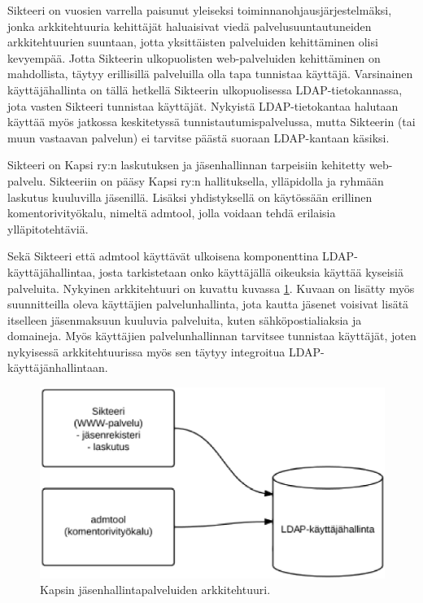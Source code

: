 Sikteeri on vuosien varrella paisunut yleiseksi toiminnanohjausjärjestelmäksi, jonka arkkitehtuuria kehittäjät haluaisivat viedä palvelusuuntautuneiden arkkitehtuurien suuntaan, jotta yksittäisten palveluiden kehittäminen olisi kevyempää. Jotta Sikteerin ulkopuolisten web-palveluiden kehittäminen on mahdollista, täytyy erillisillä palveluilla olla tapa tunnistaa käyttäjä. Varsinainen käyttäjähallinta on tällä hetkellä Sikteerin ulkopuolisessa LDAP-tietokannassa, jota vasten Sikteeri tunnistaa käyttäjät. Nykyistä LDAP-tietokantaa halutaan käyttää myös jatkossa keskitetyssä tunnistautumispalvelussa, mutta Sikteerin (tai muun vastaavan palvelun) ei tarvitse päästä suoraan LDAP-kantaan käsiksi.

Sikteeri on Kapsi ry:n laskutuksen ja jäsenhallinnan tarpeisiin kehitetty web-palvelu. Sikteeriin on pääsy Kapsi ry:n hallituksella, ylläpidolla ja ryhmään laskutus kuuluvilla jäsenillä. Lisäksi yhdistyksellä on käytössään erillinen komentorivityökalu, nimeltä admtool, jolla voidaan tehdä erilaisia ylläpitotehtäviä.

Sekä Sikteeri että admtool käyttävät ulkoisena komponenttina LDAP-käyt\-tä\-jä\-hal\-lin\-taa, josta tarkistetaan onko käyttäjällä oikeuksia käyttää kyseisiä palveluita. Nykyinen arkkitehtuuri on kuvattu kuvassa \ref{kapsi_nykyinen}. Kuvaan on lisätty myös suunnitteilla oleva käyttäjien palvelunhallinta, jota kautta jäsenet voisivat lisätä itselleen jäsenmaksuun kuuluvia palveluita, kuten sähköpostialiaksia ja domaineja. Myös käyttäjien palvelunhallinnan tarvitsee tunnistaa käyttäjät, joten nykyisessä arkkitehtuurissa myös sen täytyy integroitua LDAP-käyttäjänhallintaan.

\begin{figure}[h]
\centering
\includegraphics[width=.7\textwidth]{toteutus/kapsi_nykyinen.eps}
\caption{Kapsin jäsenhallintapalveluiden arkkitehtuuri.}%
\label{kapsi_nykyinen}
\end{figure}

